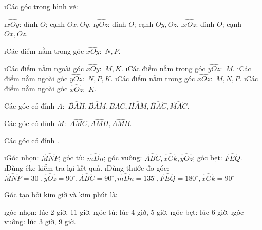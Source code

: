 \begin{Answer}{35}
		\begin{enumerate}[a),leftmargin=*]
			\i Các góc trong hình vẽ:
			\begin{enumerate}[--,leftmargin=*]
				\i $\widehat{xOy}$: đỉnh $O$; cạnh $Ox,Oy$.
				\i $\widehat{yOz}$: đỉnh $O$; cạnh $Oy,Oz$.
				\i $\widehat{xOz}$: đỉnh $O$; cạnh $Ox,Oz$.
			\end{enumerate}
			\i Các điểm nằm trong góc $\widehat{xOy}:\,\,N,P$.
			\begin{enumerate}[--,leftmargin=*]
				\i Các điểm nằm ngoài góc $\widehat{xOy}:\,\,M,K$.
				\i Các điểm nằm trong góc $\widehat{yOz}:\,\,M$.
				\i Các điểm nằm ngoài góc $\widehat{yOz}:\,\,N,P,K$.
				\i Các điểm nằm trong góc $\widehat{xOz}:\,\,M,N,P$.
				\i Các điểm nằm ngoài góc $\widehat{xOz}:\,\,K$.
			\end{enumerate}
		\end{enumerate}
	
\end{Answer}
\begin{Answer}{36}
		Các góc có đỉnh $A:\,\,\widehat{BAH},\widehat{BAM},\widehat{BAC},\widehat{HAM},\widehat{HAC},\widehat{MAC}$.
		
		Các góc có đỉnh $M:\,\,\widehat{AMC},\widehat{AMH},\widehat{AMB}$.
		
		Các góc có đỉnh .
	
\end{Answer}
\begin{Answer}{37}
		\begin{enumerate}[a),leftmargin=*]
			\i Góc nhọn: $\widehat{MNP}$; góc tù: $\widehat{mDn}$; góc vuông: $\widehat{ABC},\widehat{xGk},\widehat{yOz}$; góc bẹt: $\widehat{FEQ}$.
			\i Dùng êke kiểm tra lại kết quả.
			\i Dùng thước đo góc: $\widehat{MNP}={{30}^\circ},\widehat{yOz}={{90}^\circ},\widehat{ABC}={{90}^\circ},\widehat{mDn}={{135}^\circ},\widehat{FEQ}={{180}^\circ},\widehat{xGk}={{90}^\circ}$
		\end{enumerate}
	
\end{Answer}
\begin{Answer}{38}
		Góc tạo bởi kim giờ và kim phút là:
		\begin{enumerate}[a),leftmargin=*]
			\i góc nhọn: lúc 2 giờ, 11 giờ.
			\i góc tù: lúc 4 giờ, 5 giờ.
			\i góc bẹt: lúc 6 giờ.
			\i góc vuông: lúc 3 giờ, 9 giờ.
		\end{enumerate}
	
\end{Answer}
